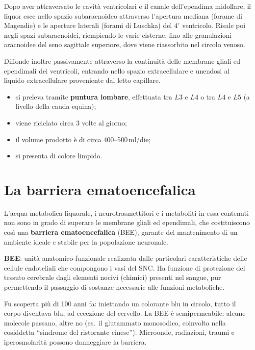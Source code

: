 Dopo aver attraversato le cavità ventricolari e il canale dell'ependima
midollare, il liquor esce nello spazio subaracnoideo attraverso l'apertura
mediana (forame di Magendie) e le aperture laterali (forami di Luschka) del
$4^\circ$ ventricolo. Risale poi negli spazi subaracnoidei, riempiendo le
varie cisterne, fino alle granulazioni aracnoidee del seno sagittale
superiore, dove viene riassorbito nel circolo venoso.

Diffonde inoltre passivamente attraverso la continuità delle membrane gliali
ed ependimali dei ventricoli, entrando nello spazio extracellulare e
unendosi al liquido extracellulare proveniente dal letto capillare.

\begin{itemize}
  \item si preleva tramite \textbf{puntura lombare}, effettuata tra $L3$ e
    $L4$ o tra $L4$ e $L5$ (a livello della cauda equina);
  \item viene riciclato circa 3 volte al giorno;
  \item il volume prodotto è di circa 400--500\,ml/die;
  \item si presenta di colore limpido.
\end{itemize}

\section{La barriera ematoencefalica}

L'acqua metabolica liquorale, i neurotrasmettitori e i metaboliti in essa
contenuti non sono in grado di superare le membrane gliali ed ependimali,
che costituiscono così una \textbf{barriera ematoencefalica} (BEE), garante
del mantenimento di un ambiente ideale e stabile per la popolazione
neuronale.

\textbf{BEE}: unità anatomico-funzionale realizzata dalle particolari
caratteristiche delle cellule endoteliali che compongono i vasi del SNC. Ha
funzione di protezione del tessuto cerebrale dagli elementi nocivi (chimici)
presenti nel sangue, pur permettendo il passaggio di sostanze necessarie
alle funzioni metaboliche.

Fu scoperta più di 100 anni fa: iniettando un colorante blu in circolo,
tutto il corpo diventava blu, ad eccezione del cervello. La BEE è
semipermeabile: alcune molecole passano, altre no (es.\ il glutammato
monosodico, coinvolto nella cosiddetta ``sindrome del ristorante cinese'').
Microonde, radiazioni, traumi e iperosmolarità possono danneggiare la
barriera.

